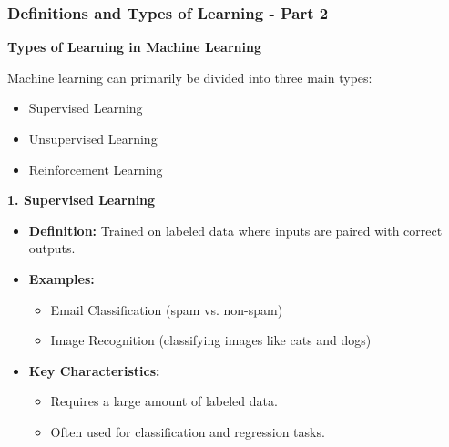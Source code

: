 \documentclass{beamer}
\begin{document}
\begin{frame}[fragile]
    \frametitle{Definitions and Types of Learning - Part 2}
    
    \textbf{Types of Learning in Machine Learning}

    Machine learning can primarily be divided into three main types:
    \begin{itemize}
        \item Supervised Learning
        \item Unsupervised Learning
        \item Reinforcement Learning
    \end{itemize}
    
    \textbf{1. Supervised Learning}
    \begin{itemize}
        \item \textbf{Definition:} Trained on labeled data where inputs are paired with correct outputs.
        \item \textbf{Examples:}
        \begin{itemize}
            \item Email Classification (spam vs. non-spam)
            \item Image Recognition (classifying images like cats and dogs)
        \end{itemize}
        \item \textbf{Key Characteristics:}
        \begin{itemize}
            \item Requires a large amount of labeled data.
            \item Often used for classification and regression tasks.
        \end{itemize}
    \end{itemize}
\end{frame}
\end{document}
